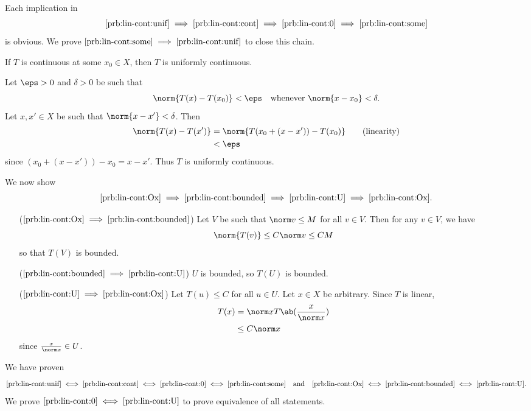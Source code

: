 \documentclass[12pt]{article}
\begin{document}
\begin{solution}
    Each implication in \[
        \ref{prb:lin-cont:unif}
        \implies \ref{prb:lin-cont:cont}
        \implies \ref{prb:lin-cont:0}
        \implies \ref{prb:lin-cont:some}
    \] is obvious.
    We prove $\ref{prb:lin-cont:some} \implies \ref{prb:lin-cont:unif}$
    to close this chain.

    \begin{claim}
        If $T$ is continuous at some $x_0 \in X$, then $T$ is uniformly
        continuous.
    \end{claim}
    \begin{subproof}
        Let $\eps > 0$ and $\delta > 0$ be such that \[
            \norm{T(x) - T(x_0)} < \eps
            \quad\text{whenever } \norm{x - x_0} < \delta.
        \] Let $x, x' \in X$ be such that $\norm{x - x'} < \delta$.
        Then \begin{align*}
            \norm{T(x) - T(x')}
            &= \norm{T(x_0 + (x - x')) - T(x_0)} \tag{linearity} \\
            &< \eps
        \end{align*} since $(x_0 + (x - x')) - x_0 = x - x'$.
        Thus $T$ is uniformly continuous.
    \end{subproof}

    We now show \[
        \ref{prb:lin-cont:Ox}
        \implies \ref{prb:lin-cont:bounded}
        \implies \ref{prb:lin-cont:U}
        \implies \ref{prb:lin-cont:Ox}.
    \]
    \begin{enumerate}
        \item[($\ref{prb:lin-cont:Ox} \implies \ref{prb:lin-cont:bounded}$)]
        Let $V$ be such that $\norm v \le M$ for all $v \in V$.
        Then for any $v \in V$, we have \[
            \norm{T(v)} \le C\norm v \le CM
        \] so that $T(V)$ is bounded.
        \item[($\ref{prb:lin-cont:bounded} \implies \ref{prb:lin-cont:U}$)]
        $U$ is bounded, so $T(U)$ is bounded.
        \item[($\ref{prb:lin-cont:U} \implies \ref{prb:lin-cont:Ox}$)]
        Let $T(u) \le C$ for all $u \in U$.
        Let $x \in X$ be arbitrary.
        Since $T$ is linear, \begin{align*}
            T(x) &= \norm x T\ab(\frac{x}{\norm x}) \\
            &\le C \norm x
        \end{align*} since $\frac{x}{\norm x} \in U$.
    \end{enumerate}
    We have proven \[
        \ref{prb:lin-cont:unif}
            \iff \ref{prb:lin-cont:cont}
            \iff \ref{prb:lin-cont:0}
            \iff \ref{prb:lin-cont:some}
        \quad\text{and}\quad
        \ref{prb:lin-cont:Ox}
            \iff \ref{prb:lin-cont:bounded}
            \iff \ref{prb:lin-cont:U}.
    \] We prove $\ref{prb:lin-cont:0} \iff \ref{prb:lin-cont:U}$ to prove
    equivalence of all statements.


\end{solution}
\end{document}
